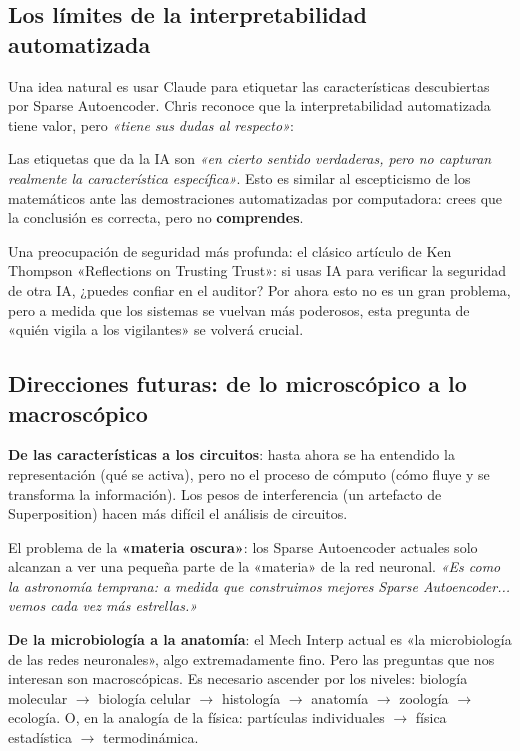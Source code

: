 \subsection{Los límites de la interpretabilidad automatizada}

Una idea natural es usar Claude para etiquetar las características descubiertas por Sparse Autoencoder. Chris reconoce que la interpretabilidad automatizada tiene valor, pero \textit{«tiene sus dudas al respecto»}:

Las etiquetas que da la IA son \textit{«en cierto sentido verdaderas, pero no capturan realmente la característica específica»}. Esto es similar al escepticismo de los matemáticos ante las demostraciones automatizadas por computadora: crees que la conclusión es correcta, pero no \textbf{comprendes}.

Una preocupación de seguridad más profunda: el clásico artículo de Ken Thompson «Reflections on Trusting Trust»: si usas IA para verificar la seguridad de otra IA, ¿puedes confiar en el auditor? Por ahora esto no es un gran problema, pero a medida que los sistemas se vuelvan más poderosos, esta pregunta de «quién vigila a los vigilantes» se volverá crucial.

\subsection{Direcciones futuras: de lo microscópico a lo macroscópico}

\textbf{De las características a los circuitos}: hasta ahora se ha entendido la representación (qué se activa), pero no el proceso de cómputo (cómo fluye y se transforma la información). Los pesos de interferencia (un artefacto de Superposition) hacen más difícil el análisis de circuitos.

El problema de la \textbf{«materia oscura»}: los Sparse Autoencoder actuales solo alcanzan a ver una pequeña parte de la «materia» de la red neuronal. \textit{«Es como la astronomía temprana: a medida que construimos mejores Sparse Autoencoder... vemos cada vez más estrellas.»}

\textbf{De la microbiología a la anatomía}: el Mech Interp actual es «la microbiología de las redes neuronales», algo extremadamente fino. Pero las preguntas que nos interesan son macroscópicas. Es necesario ascender por los niveles: biología molecular $\to$ biología celular $\to$ histología $\to$ anatomía $\to$ zoología $\to$ ecología. O, en la analogía de la física: partículas individuales $\to$ física estadística $\to$ termodinámica.

